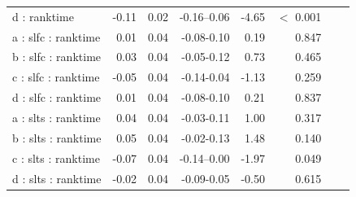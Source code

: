 \documentclass[pdflatex,sn-nature]{sn-jnl}%
\theoremstyle{thmstyleone}%
\theoremstyle{thmstyletwo}%
\theoremstyle{thmstylethree}%
\begin{document}
\begin{appendices}
\begin{table}[h!]
\begin{tabular}{lrrrrrrr}
   d : ranktime & -0.11 & 0.02 & -0.16--0.06 & -4.65 &  $<$  0.001 \\ 
   a : slfc : ranktime & 0.01 & 0.04 & -0.08-0.10 & 0.19 &    0.847 \\ 
   b : slfc : ranktime & 0.03 & 0.04 & -0.05-0.12 & 0.73 &    0.465 \\ 
   c : slfc : ranktime & -0.05 & 0.04 & -0.14-0.04 & -1.13 &    0.259 \\ 
   d : slfc : ranktime & 0.01 & 0.04 & -0.08-0.10 & 0.21 &    0.837 \\ 
   a : slts : ranktime & 0.04 & 0.04 & -0.03-0.11 & 1.00 &    0.317 \\ 
   b : slts : ranktime & 0.05 & 0.04 & -0.02-0.13 & 1.48 &    0.140 \\ 
   c : slts : ranktime & -0.07 & 0.04 & -0.14--0.00 & -1.97 &    0.049 \\ 
   d : slts : ranktime & -0.02 & 0.04 & -0.09-0.05 & -0.50 &    0.615 \\ 
   \hline
\end{tabular}
\end{table}




\end{appendices}
\end{document}
